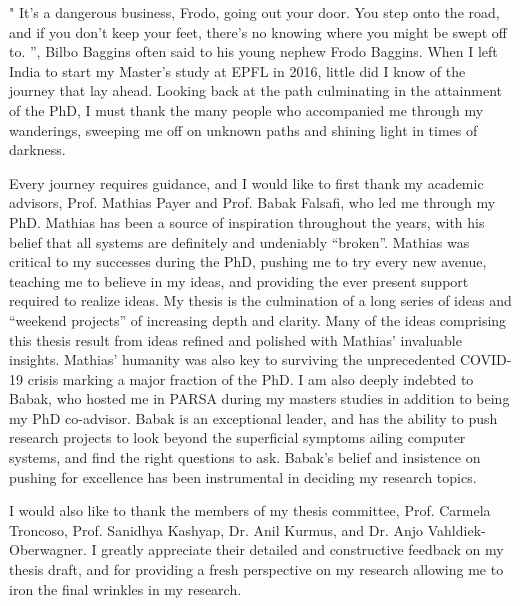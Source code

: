 "
It's a dangerous business, Frodo, going out your door. 
You step onto the road, and if you don't keep your feet, there's no knowing where you might be swept off to.
”, 
Bilbo Baggins often said to his young nephew Frodo Baggins. 
When I left India to start my Master's study at EPFL in 2016,
little did I know of the journey that lay ahead. 
Looking back at the path culminating in the attainment of the PhD, 
I must thank the many people who accompanied me through my wanderings, 
sweeping me off on unknown paths
and shining light  in times of darkness.

Every journey requires guidance, and I would like to first thank my academic advisors,
Prof. Mathias Payer and Prof. Babak Falsafi, who led me through my PhD.
Mathias has been a source of inspiration throughout the years,
with his belief that all systems are definitely and undeniably ``broken''.
Mathias was critical to my successes during the PhD, pushing me to try
every new avenue, teaching me to believe in my ideas, and providing the ever present
support required to realize ideas. 
My thesis is the culmination of a long series of ideas and ``weekend projects'' of 
increasing depth and clarity.
Many of the ideas comprising this thesis result from ideas refined and
polished with Mathias' invaluable insights.
Mathias' humanity was also key to surviving the unprecedented COVID-19 crisis
marking a major fraction of the PhD.
I am also deeply indebted to Babak, who hosted me in PARSA during my masters studies
in addition to being my PhD co-advisor. 
Babak is an exceptional leader, and has the ability to push research projects to look beyond the
superficial symptoms ailing computer systems, and find the right questions to ask.
Babak's belief and insistence on pushing for excellence has been instrumental in
deciding my research topics.

I would also like to thank the members of my
thesis committee, Prof. Carmela Troncoso, Prof. Sanidhya Kashyap, Dr. Anil Kurmus, 
and Dr. Anjo Vahldiek-Oberwagner.
I greatly appreciate their detailed and constructive feedback on my thesis draft,
and for providing a fresh perspective on my research allowing me to iron the final 
wrinkles in my research.

